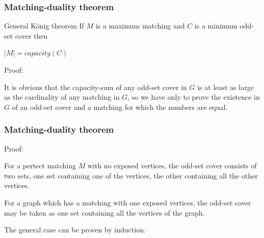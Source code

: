 \documentclass[hyperref={pdfpagelabels=false}]{beamer}
\begin{document}
\frame
{
	\frametitle{Matching-duality theorem}
	
	\begin{block}{General K\"{o}nig theorem}
		If $M$ is a maximum matching and $C$ is a minimum odd-set cover then
		\begin{center}
		$|M| = capacity(C)$
		\end{center}
	\end{block}
	
	\begin{itemize}
	{
		\item Proof:
		
		\bigskip
		
		It is obvious that the capacity-sum of any odd-set cover in $G$ is at least as large as the cardinality of any matching in $G$, so we have only to prove the existence in $G$ of an odd-set cover and a matching for which the numbers are equal.
	}
	\end{itemize}
}

\frame
{
	\frametitle{Matching-duality theorem}
	
	\begin{itemize}
	{
		\item Proof:
		
		\bigskip
		
		For a pertect matching $M$ with no exposed vertices, the odd-set cover consists of two sets, one set  containing one of the vertices, the other containing all the other vertices.
		
		\bigskip
		
		For a graph which has a matching with one exposed vertices, the odd-set cover may be taken as one set containing all the vertices of the graph.
		
		\bigskip
		
		The general case can be proven by induction.
		
	}
	\end{itemize}
}

%	
%		
%		
\end{document}
